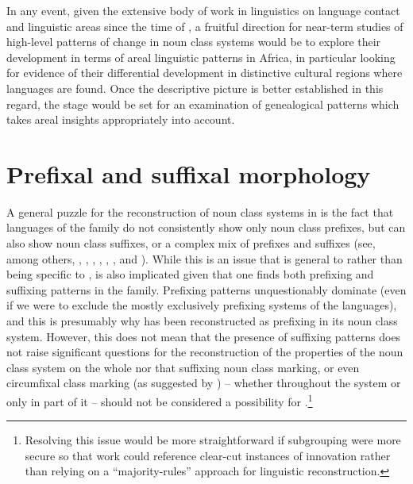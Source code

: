 \documentclass[output=paper ,collection	  ,collectionchapter ,biblatexbackend=biber   ]{langscibook}
\begin{document}
In any event, given the extensive body of work in linguistics on language
contact and linguistic areas since the time of , a
fruitful direction for near-term studies of high-level patterns of change in
 noun class systems would be to explore their development in
terms of areal linguistic patterns in Africa, in particular looking for evidence
of their differential development in distinctive cultural regions where
 languages are found. Once the descriptive picture is better
established in this regard, the stage would be set for an examination of
genealogical patterns which takes areal insights appropriately into account.




\section{Prefixal and suffixal morphology \label{PrefSuf}}\label{sec:good:3}

A general puzzle for the reconstruction of noun class systems in  is
the fact that languages of the family do not consistently show only noun class
prefixes, but can also show noun class suffixes, or a complex mix of prefixes
and suffixes (see, among others, ,
, ,
, ,
, and
). While this is an issue that is general
to  rather than being specific to ,  is also implicated given that one finds both prefixing and
suffixing patterns in the family. Prefixing patterns unquestionably dominate
(even if we were to exclude the mostly exclusively prefixing systems of the
 languages), and this is presumably why  has been
reconstructed as prefixing in its noun class system. However, this does not mean
that the presence of suffixing patterns does not raise significant questions for
the reconstruction of the properties of the noun class system on the whole nor
that suffixing noun class marking, or even circumfixal class marking (as
suggested by ) -- whether throughout the system
or only in part of it -- should not be considered a possibility for
.{\footnote{Resolving this issue would be more straightforward
if  subgrouping were more secure so that work could reference
clear-cut instances of innovation rather than relying on a “majority-rules”
approach for linguistic reconstruction.}}
\end{document}

